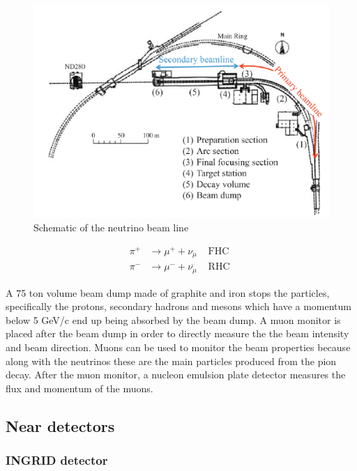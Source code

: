 \begin{figure}
    \includegraphics[width=\textwidth]{Figures/nubeamline.png}
    \caption{Schematic of the neutrino beam line}
        \label{fig:nubeamline}
\end{figure}

\begin{equation}
\begin{array}{lll}
\pi^{+} & \longrightarrow \mu^{+}+\nu_{\mu} & \text { FHC } \\
\pi^{-} & \longrightarrow \mu^{-}+\overline{\nu_{\mu}} & \text { RHC }
\end{array}
\label{eq:nubeam}
\end{equation}

A 75 ton volume beam dump made of graphite and iron stops the particles, specifically the protons, secondary hadrons and mesons which have a momentum below 5 GeV/c end up being absorbed by the beam dump. A muon monitor is placed after the beam dump in order to directly measure the the beam intensity and beam direction. Muons can be used to monitor the beam properties because along with the neutrinos these are the main particles produced from the pion decay. After the muon monitor, a nucleon emulsion plate detector measures the flux and momentum of the muons. 

\subsection{Near detectors}

\subsubsection{INGRID detector}

